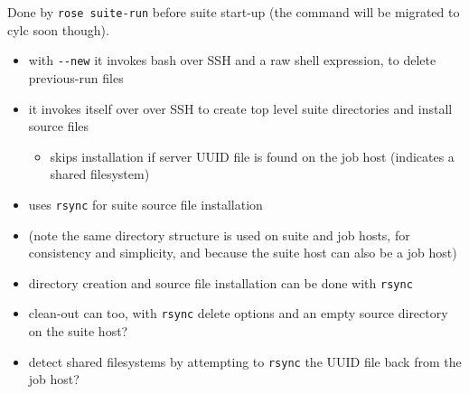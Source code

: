 \documentclass{article}
\begin{document}
Done by \lstinline=rose suite-run= before suite start-up
(the command will be migrated to cylc soon though).

\begin{itemize}
  \item with \lstinline=--new= it invokes bash over SSH and a raw shell
    expression, to delete previous-run files
  \item it invokes itself over over SSH to create top level suite directories
    and install source files
    \begin{itemize}
      \item skips installation if server UUID file is found on the job host
        (indicates a shared filesystem)
    \end{itemize}
  \item uses \lstinline=rsync= for suite source file installation
  \item (note the same directory structure is used on suite and job hosts, for
    consistency and simplicity, and because the suite host can also be a job host)
\end{itemize}

{\color{blue}{\bf SSH-free?}
\begin{itemize}
  \item directory creation and source file installation can be done with \lstinline=rsync=
  \item clean-out can too, with \lstinline=rsync= delete options and an empty
    source directory on the suite host?
  \item detect shared filesystems by attempting to \lstinline=rsync= the UUID
    file back from the job host?
\end{itemize} 
}

\lstset{breaklines=true}
\lstset{language=jobhosts}
\end{document}
